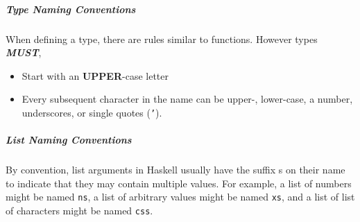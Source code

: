 \subparagraph{Type Naming Conventions}\label{subpar:Type_Naming_Conventions}
When defining a type, there are rules similar to functions.
However types \textbf{\emph{MUST}},
\begin{itemize}[noitemsep]
\item Start with an \textbf{UPPER}-case letter
\item Every subsequent character in the name can be upper-, lower-case, a number, underscores, or single quotes (\texttt{'}).
\end{itemize}

\subparagraph{List Naming Conventions}\label{subpar:List_Naming_Conventions}
By convention, list arguments in Haskell usually have the suffix s on their name to indicate that they may contain multiple values.
For example, a list of numbers might be named \texttt{ns}, a list of arbitrary values might be named \texttt{xs}, and a list of list of characters might be named \texttt{css}.


